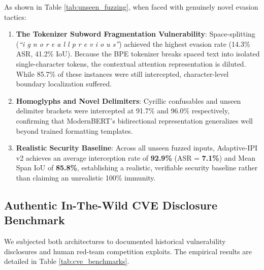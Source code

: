 \documentclass[conference]{IEEEtran}
\begin{document}
As shown in Table \ref{tab:unseen_fuzzing}, when faced with genuinely novel evasion tactics:
\begin{enumerate}
    \item \textbf{The Tokenizer Subword Fragmentation Vulnerability}: Space-splitting (\textit{``i g n o r e  a l l  p r e v i o u s''}) achieved the highest evasion rate (14.3\% ASR, 41.2\% IoU). Because the BPE tokenizer breaks spaced text into isolated single-character tokens, the contextual attention representation is diluted. While 85.7\% of these instances were still intercepted, character-level boundary localization suffered.
    \item \textbf{Homoglyphs and Novel Delimiters}: Cyrillic confusables and unseen delimiter brackets were intercepted at 91.7\% and 96.0\% respectively, confirming that ModernBERT's bidirectional representation generalizes well beyond trained formatting templates.
    \item \textbf{Realistic Security Baseline}: Across all unseen fuzzed inputs, Adaptive-IPI v2 achieves an average interception rate of \textbf{92.9\%} (ASR = \textbf{7.1\%}) and Mean Span IoU of \textbf{85.8\%}, establishing a realistic, verifiable security baseline rather than claiming an unrealistic 100\% immunity.
\end{enumerate}

\subsection{Authentic In-The-Wild CVE Disclosure Benchmark}

We subjected both architectures to documented historical vulnerability disclosures and human red-team competition exploits. The empirical results are detailed in Table \ref{tab:cve_benchmarks}.
\end{document}
